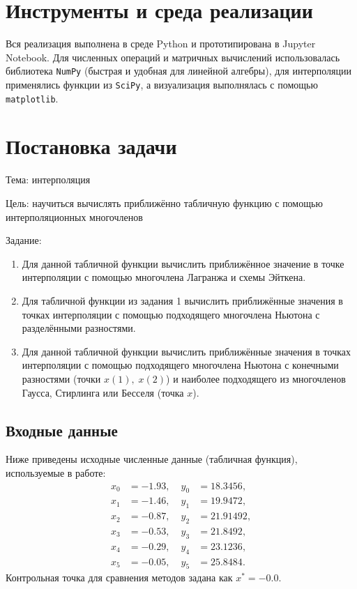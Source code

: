 
\section{Инструменты и среда реализации}
Вся реализация выполнена в среде Python и прототипирована в Jupyter Notebook. Для численных операций и матричных вычислений использовалась библиотека \texttt{NumPy} (быстрая и удобная для линейной алгебры), для интерполяции применялись функции из \texttt{SciPy}, а визуализация выполнялась с помощью \texttt{matplotlib}.

\section{Постановка задачи}

Тема: интерполяция

Цель: научиться вычислять приближённо табличную функцию с помощью интерполяционных многочленов

Задание:

\begin{enumerate}
    \item Для данной табличной функции вычислить приближённое значение в точке интерполяции с помощью многочлена Лагранжа и схемы Эйткена.
    \item Для табличной функции из задания 1 вычислить приближённые значения в точках интерполяции с помощью подходящего многочлена Ньютона с разделёнными разностями.
    \item Для данной табличной функции вычислить приближённые значения в точках интерполяции с помощью подходящего многочлена Ньютона с конечными разностями (точки $x(1),\; x(2)$) и наиболее подходящего из многочленов Гаусса, Стирлинга или Бесселя (точка $x$).
\end{enumerate}

\subsection*{Входные данные}
Ниже приведены исходные численные данные (табличная функция), используемые в работе:
\[
\begin{aligned}
x_0 &= -1.93, &\; y_0 &= 18.3456,\\
x_1 &= -1.46, &\; y_1 &= 19.9472,\\
x_2 &= -0.87, &\; y_2 &= 21.91492,\\
x_3 &= -0.53, &\; y_3 &= 21.8492,\\
x_4 &= -0.29, &\; y_4 &= 23.1236,\\
x_5 &= -0.05, &\; y_5 &= 25.8484.
\end{aligned}
\]
Контрольная точка для сравнения методов задана как $x^{*}=-0.0$.


